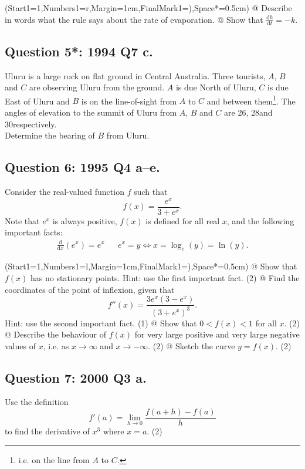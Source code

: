 \documentclass[a4paper,11pt]{article}
\newcommand{\diff}[2]{\frac{\mathrm{d}#1}{\mathrm{d}#2}}
\begin{document}
\begin{easylist}
	\ListProperties(Start1=1,Numbers1=r,Margin=1cm,FinalMark1={)},Space*=0.5cm)
	@ Describe in words what the rule says about the rate of evaporation.
	@ Show that $\diff{h}{t} = -k$.
\end{easylist}

\subsection*{Question 5*: 1994 Q7 c.}
Uluru is a large rock on flat ground in Central Australia. Three tourists, $A$, $B$ and $C$ are observing Uluru from the ground. $A$ is due North of Uluru, $C$ is due East of Uluru and $B$ is on the line-of-sight from $A$ to $C$ and between them\footnote{i.e. on the line from $A$ to $C$.}. The angles of elevation to the summit of Uluru from $A$, $B$ and $C$ are 26\degrees, 28\degree and 30\degree respectively.\\

\noindent Determine the bearing of $B$ from Uluru.
\pagebreak

\subsection*{Question 6: 1995 Q4 a--e.}
Consider the real-valued function $f$ such that
$$
f(x) = \frac{e^x}{3+e^x}.
$$
Note that $e^x$ is always positive, $f(x)$ is defined for all real $x$, and the following important facts:
\begin{align*}
\diff{}{x}\left(e^x\right) = e^x && e^x = y \iff x = \log_e(y) = \ln(y).
\end{align*}
\begin{easylist}
	\ListProperties(Start1=1,Numbers1=l,Margin=1cm,FinalMark1={)},Space*=0.5cm)
	@ Show that $f(x)$ has no stationary points. Hint: use the first important fact. (2)
	@ Find the coordinates of the point of inflexion, given that
	$$
	f''(x) = \frac{3e^x(3-e^x)}{(3+e^x)^3}.
	$$
	Hint: use the second important fact. (1)
	@ Show that $0<f(x)<1$ for all $x$. (2)
	@ Describe the behaviour of $f(x)$ for very large positive and very large negative values of $x$, i.e. as $x\to\infty$ and $x\to-\infty$. (2)
	@ Sketch the curve $y=f(x)$. (2)
\end{easylist}

\subsection*{Question 7: 2000 Q3 a.}
Use the definition
$$
f'(a) = \lim\limits_{h\to 0}\frac{f(a+h)-f(a)}{h}
$$
to find the derivative of $x^3$ where $x=a$. (2)
\end{document}
